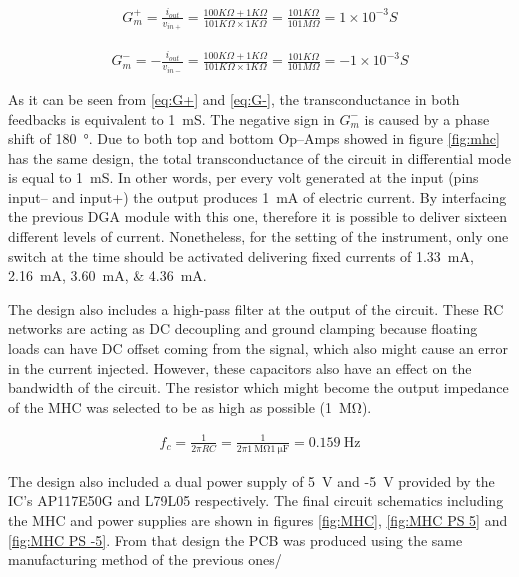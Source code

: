 \begin{align}
\label{eq:G+}
G^+_m=\frac{i_{out}}{v_{in+}}=\frac{100K\Omega + 1K\Omega}{101K\Omega \times 1K\Omega}=\frac{101K\Omega}{101M\Omega}=1\times10^{-3}S 
\end{align}

\begin{align}
\label{eq:G-}
G^-_m=-\frac{i_{out}}{v_{in-}}=\frac{100K\Omega + 1K\Omega}{101K\Omega \times 1K\Omega}=\frac{101K\Omega}{101M\Omega}=-1\times10^{-3}S 
\end{align}

As it can be seen from \ref{eq:G+} and \ref{eq:G-}, the transconductance in both feedbacks is equivalent to \SI{1}{\milli\siemens}. The negative sign in $G^{-}_m$ is caused by a phase shift of \SI{180}{\degree}. Due to both top and bottom Op–Amps showed in figure \ref{fig:mhc} has the same design, the total transconductance of the circuit in differential mode is equal to \SI{1}{\milli\siemens}. In other words, per every volt generated at the input (pins input– and input+) the output produces \SI{1}{\mA} of electric current. By interfacing the previous DGA module with this one, therefore it is possible to deliver sixteen different levels of current. Nonetheless, for the setting of the instrument, only one switch at the time should be activated delivering fixed currents of \SIlist{1.33;2.16;3.60;4.36}{\mA}.

The design also includes a high-pass filter at the output of the circuit. These RC networks are acting as DC decoupling and ground clamping because floating loads can have DC offset coming from the signal, which also might cause an error in the current injected. However, these capacitors also have an effect on the bandwidth of the circuit. The resistor which might become the output impedance of the MHC was selected to be as high as possible (\SI{1}{\mega\ohm}).

\begin{align}
	\label{eq:MHC filter}
	f_c = \frac{1}{2 \pi R C} = \frac{1}{2 \pi \SI{1}{\mega\ohm} \SI{1}{\micro\farad}} = \SI{0.159}{\hertz}
\end{align}

The design also included a dual power supply of \SI{5}{\volt} and -\SI{5}{\volt} provided by the IC's AP117E50G and L79L05 respectively. The final circuit schematics including the MHC and power supplies are shown in figures \ref{fig:MHC}, \ref{fig:MHC PS 5} and \ref{fig:MHC PS -5}. From that design the PCB was produced using the same manufacturing method of the previous ones/


